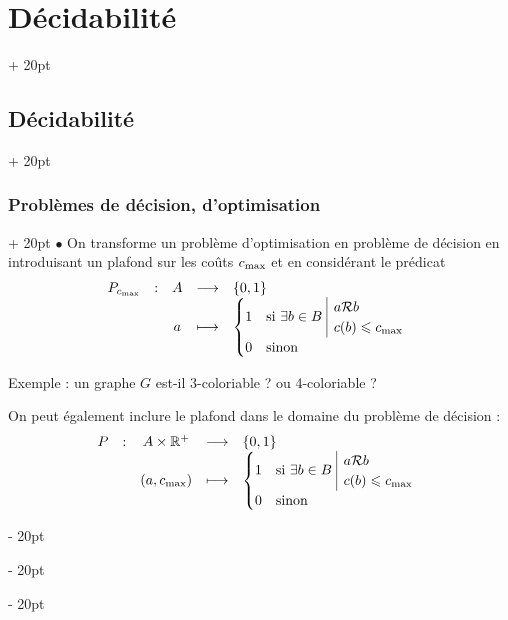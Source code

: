 \documentclass[a4paper, 12pt, twoside]{article}
\newcommand{\R}{\mathbb{R}} %
\newcommand{\set}[1]{\left\{ #1 \right\}}
\renewcommand{\le}{\leqslant}
\newcommand{\ind}[1][20pt]{\advance\leftskip + #1}
\newcommand{\deind}[1][20pt]{\advance\leftskip - #1}
\newenvironment{indt}[2][20pt]{#2 \par \ind[#1]}{\par \deind} %
\begin{document}
\begin{indt}{\section{Décidabilité}}
\begin{indt}{\subsection{Décidabilité}}
\begin{indt}{\subsubsection{Problèmes de décision, d'optimisation}}
                $\bullet$ On transforme un problème d'optimisation en problème de décision en introduisant un plafond sur les coûts $c_{\rm max}$ et en considérant le prédicat
                \[
                    \begin{array}{ccccl}
                        P_{c_{\rm max}}
                        & : & A & \longrightarrow & \set{0, 1}
                        \\
                        && a & \longmapsto &
                        \begin{cases}
                            1 & \text{si}\ \exists b \in B\
                            \begin{array}{|l}
                                a \mathcal R b
                                \\
                                c(b) \le c_{\rm max}
                            \end{array}
                            \\
                            0 & \text{sinon}
                        \end{cases}
                    \end{array}
                \]

                Exemple : un graphe $G$ est-il 3-coloriable ? ou 4-coloriable ?

                On peut également inclure le plafond dans le domaine du problème de décision :
                \[
                    \begin{array}{ccccl}
                        P
                        & : & A \times \R^+ & \longrightarrow & \set{0, 1}
                        \\
                        && (a, c_{\rm max}) & \longmapsto &
                        \begin{cases}
                            1 & \text{si}\ \exists b \in B\
                            \begin{array}{|l}
                                a \mathcal R b
                                \\
                                c(b) \le c_{\rm max}
                            \end{array}
                            \\
                            0 & \text{sinon}
                        \end{cases}
                    \end{array}
                \]


\end{indt}
\end{indt}
\end{indt}
\end{document}
